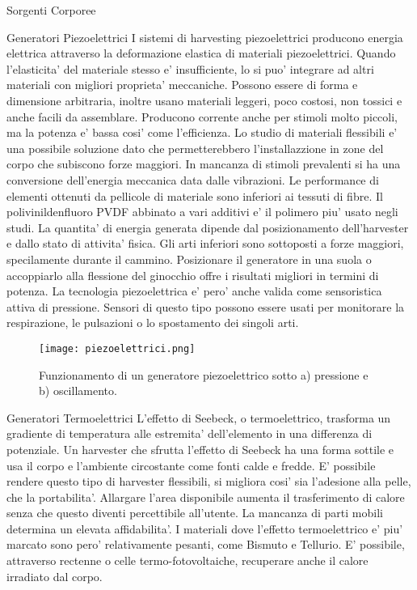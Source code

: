 \begin{section}{Sorgenti Corporee}
   \begin{subsection}{Generatori Piezoelettrici}
    I sistemi di harvesting piezoelettrici producono energia elettrica attraverso la deformazione elastica di materiali piezoelettrici. Quando l'elasticita' del materiale stesso e' insufficiente, lo si puo' integrare ad altri materiali con migliori proprieta' meccaniche. Possono essere di forma e dimensione arbitraria, inoltre usano materiali leggeri, poco costosi, non tossici e anche facili da assemblare. Producono corrente anche per stimoli molto piccoli, ma la potenza e' bassa cosi' come l'efficienza. Lo studio di materiali flessibili e' una possibile soluzione dato che permetterebbero l'installazzione in zone del corpo che subiscono forze maggiori. In mancanza di stimoli prevalenti si ha una conversione dell'energia meccanica data dalle vibrazioni. Le performance di elementi ottenuti da pellicole di materiale sono inferiori ai tessuti di fibre. Il polivinildenfluoro PVDF abbinato a vari additivi e' il polimero piu' usato negli studi. La quantita' di energia generata dipende dal posizionamento dell'harvester e dallo stato di attivita' fisica. Gli arti inferiori sono sottoposti a forze maggiori, specilamente durante il cammino. Posizionare il generatore in una suola o accoppiarlo alla flessione del ginocchio offre i risultati migliori in termini di potenza. La tecnologia piezoelettrica e' pero' anche valida come sensoristica attiva di pressione. Sensori di questo tipo possono essere usati per monitorare la respirazione, le pulsazioni o lo spostamento dei singoli arti.
    \begin{figure}[H]
        \texttt{[image: piezoelettrici.png]}
        \centering
        \caption{Funzionamento di un generatore piezoelettrico sotto a) pressione e b) oscillamento.}
        \label{fig:piezoelettrici}
    \end{figure}
   \end{subsection}

   \begin{subsection}{Generatori Termoelettrici}
    L'effetto di Seebeck, o termoelettrico, trasforma un gradiente di temperatura alle estremita' dell'elemento in una differenza di potenziale. Un harvester che sfrutta l'effetto di Seebeck ha una forma sottile e usa il corpo e l'ambiente circostante come fonti calde e fredde. E' possibile rendere questo tipo di harvester flessibili, si migliora cosi' sia l'adesione alla pelle, che la portabilita'. Allargare l'area disponibile aumenta il trasferimento di calore senza che questo diventi percettibile all'utente. La mancanza di parti mobili determina un elevata affidabilita'. I materiali dove l'effetto termoelettrico e' piu' marcato sono pero' relativamente pesanti, come Bismuto e Tellurio. E' possibile, attraverso rectenne o celle termo-fotovoltaiche, recuperare anche il calore irradiato dal corpo.
   \end{subsection}


\end{section}
